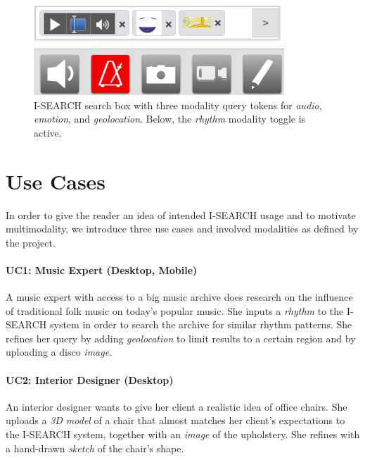 \documentclass{sig-alternate}
\let\oldemph\emph
\renewcommand{\emph}[1]{\oldemph{\fontsize{9}{9}\selectfont #1}}
\begin{document}
\begin{figure}
\includegraphics[width=\columnwidth]{./resources/ui.png}
\caption{\mbox{I-SEARCH} search box with three modality query tokens for \emph{audio}, \emph{emotion}, and \emph{geolocation}. Below, the \emph{rhythm} modality toggle is active.}
\label{fig:ui}
\end{figure}

\section{Use Cases} \label{sec:usecases}
In order to give the reader an idea of intended \mbox{I-SEARCH} usage and to motivate multimodality, we introduce three use cases and involved modalities as defined by the project.

\paragraph{UC1: Music Expert (Desktop, Mobile)}
A music expert with access to a big music archive does research on the influence of traditional folk music on today's popular music.
She inputs a \emph{rhythm} to the \mbox{I-SEARCH} system in order to search the archive for similar rhythm patterns.
She refines her query by adding \emph{geolocation} to limit results to a certain region and by uploading a disco \emph{image}.

\paragraph{UC2: Interior Designer (Desktop)}
An interior designer wants to give her client a realistic idea of office chairs.
She uploads a \emph{3D model} of a chair that almost matches her client's expectations to the \mbox{I-SEARCH} system, together with an \emph{image} of the upholstery.
She refines with a hand-drawn \emph{sketch} of the chair's shape.
\end{document}
